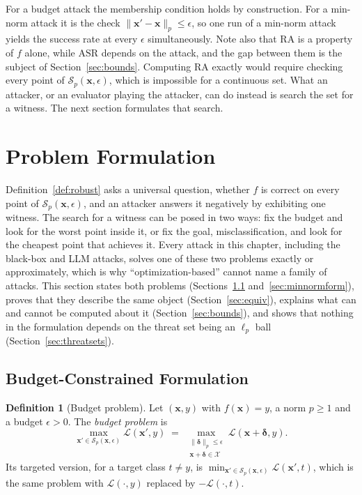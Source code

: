 \documentclass[10pt,a4paper]{extarticle}
\theoremstyle{definition}
\newtheorem{definition}{Definition}[section]
\newcommand{\X}{\mathcal{X}}
\newcommand{\Loss}{\mathcal{L}}
\newcommand{\x}{\mathbf{x}}
\newcommand{\xadv}{\mathbf{x}'}
\newcommand{\bdelta}{\boldsymbol{\delta}}
\begin{document}
For a budget attack the membership condition holds by construction. For a min-norm attack it is the check \(\|\xadv-\x\|_p\le\epsilon\), so one run of a min-norm attack yields the success rate at every \(\epsilon\) simultaneously. Note also that \(\mathrm{RA}\) is a property of \(f\) alone, while \(\mathrm{ASR}\) depends on the attack, and the gap between them is the subject of Section~\ref{sec:bounds}. Computing \(\mathrm{RA}\) exactly would require checking every point of \(\mathcal{S}_p(\x,\epsilon)\), which is impossible for a continuous set. What an attacker, or an evaluator playing the attacker, can do instead is search the set for a witness. The next section formulates that search.

\section{Problem Formulation}\label{sec:problems}

Definition~\ref{def:robust} asks a universal question, whether \(f\) is correct on every point of \(\mathcal{S}_p(\x,\epsilon)\), and an attacker answers it negatively by exhibiting one witness. The search for a witness can be posed in two ways: fix the budget and look for the worst point inside it, or fix the goal, misclassification, and look for the cheapest point that achieves it. Every attack in this chapter, including the black-box and LLM attacks, solves one of these two problems exactly or approximately, which is why \enquote{optimization-based} cannot name a family of attacks. This section states both problems (Sections~\ref{sec:budgetform} and~\ref{sec:minnormform}), proves that they describe the same object (Section~\ref{sec:equiv}), explains what can and cannot be computed about it (Section~\ref{sec:bounds}), and shows that nothing in the formulation depends on the threat set being an \(\ell_p\) ball (Section~\ref{sec:threatsets}).

\subsection{Budget-Constrained Formulation}\label{sec:budgetform}

\begin{definition}[Budget problem]\label{def:budget}
Let \((\x,y)\) with \(f(\x)=y\), a norm \(p\ge1\) and a budget \(\epsilon>0\). The \emph{budget problem} is
\begin{equation}\label{eq:budget}
\max_{\xadv\in\mathcal{S}_p(\x,\epsilon)}\Loss(\xadv,y)
\;=\;
\max_{\substack{\|\bdelta\|_p\le\epsilon\\ \x+\bdelta\in\X}}\Loss(\x+\bdelta,y).
\end{equation}
Its targeted version, for a target class \(t\neq y\), is \(\min_{\xadv\in\mathcal{S}_p(\x,\epsilon)}\Loss(\xadv,t)\), which is the same problem with \(\Loss(\cdot,y)\) replaced by \(-\Loss(\cdot,t)\).
\end{definition}
\end{document}

